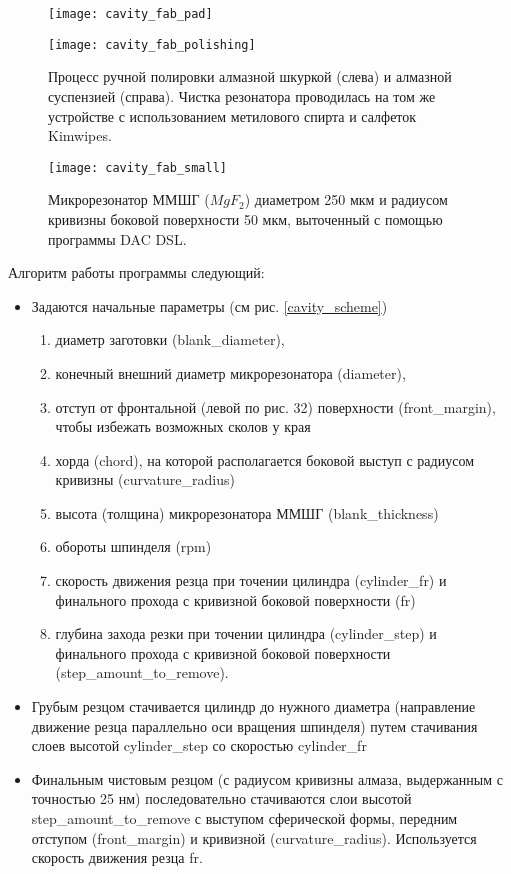 \begin{figure}[ht]
  \begin{minipage}[ht]{0.49\linewidth}\centering
    \texttt{[image: cavity\_fab\_pad]}
  \end{minipage}
  \hfill
  \begin{minipage}[ht]{0.49\linewidth}\centering
    \texttt{[image: cavity\_fab\_polishing]}
  \end{minipage}
  \caption{Процесс ручной полировки алмазной шкуркой (слева) и алмазной суспензией (справа). Чистка резонатора проводилась на том же устройстве с использованием метилового спирта и салфеток Kimwipes.}
  \label{cavity_fab}
\end{figure}

\begin{figure}[ht]
  \texttt{[image: cavity\_fab\_small]}
  \caption{Микрорезонатор ММШГ ($MgF_2$) диаметром 250 мкм и радиусом кривизны боковой поверхности 50 мкм, выточенный с помощью программы DAC DSL.}
  \label{cavity_small}
\end{figure}

Алгоритм работы программы следующий:
\begin{itemize}
  \item Задаются начальные параметры (см рис. \ref{cavity_scheme})
  \begin{enumerate}
    \item диаметр заготовки (blank_diameter),
    \item конечный внешний диаметр микрорезонатора (diameter),
    \item отступ от фронтальной (левой по рис. 32) поверхности (front_margin), чтобы избежать возможных сколов у края
    \item хорда (chord), на которой располагается боковой выступ с радиусом кривизны (curvature_radius)
    \item высота (толщина) микрорезонатора ММШГ (blank_thickness)
    \item обороты шпинделя (rpm)
    \item скорость движения резца при точении цилиндра (cylinder_fr) и финального прохода с кривизной боковой поверхности (fr)
    \item глубина захода резки при точении цилиндра (cylinder_step) и финального прохода с кривизной боковой поверхности (step_amount_to_remove).
  \end{enumerate}
  \item Грубым резцом стачивается цилиндр до нужного диаметра (направление движение резца параллельно оси вращения шпинделя) путем стачивания слоев высотой cylinder_step со скоростью cylinder_fr
  \item Финальным чистовым резцом (с радиусом кривизны алмаза, выдержанным с точностью 25 нм) последовательно стачиваются слои высотой step_amount_to_remove с выступом сферической формы, передним отступом (front_margin) и кривизной (curvature_radius). Используется скорость движения резца fr.
\end{itemize}

